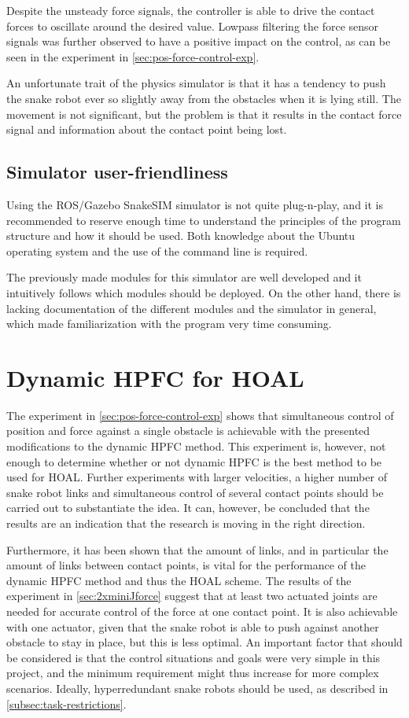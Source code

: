 Despite the unsteady force signals, the controller is able to drive the contact forces to oscillate around the desired value. Lowpass filtering the force sensor signals was further observed to have a positive impact on the control, as can be seen in the experiment in \ref{sec:pos-force-control-exp}.

An unfortunate trait of the physics simulator is that it has a tendency to push the snake robot ever so slightly away from the obstacles when it is lying still. The movement is not significant, but the problem is that it results in the contact force signal and information about the contact point being lost.

\subsection{Simulator user-friendliness}

Using the ROS/Gazebo SnakeSIM simulator is not quite plug-n-play, and it is recommended to reserve enough time to understand the principles of the program structure and how it should be used. Both knowledge about the Ubuntu operating system and the use of the command line is required.

The previously made modules for this simulator are well developed and it intuitively follows which modules should be deployed. On the other hand, there is lacking documentation of the different modules and the simulator in general, which made familiarization with the program very time consuming.

\section{Dynamic HPFC for HOAL}

The experiment in \ref{sec:pos-force-control-exp} shows that simultaneous control of position and force against a single obstacle is achievable with the presented modifications to the dynamic HPFC method. This experiment is, however, not enough to determine whether or not dynamic HPFC is the best method to be used for HOAL. Further experiments with larger velocities, a higher number of snake robot links and simultaneous control of several contact points should be carried out to substantiate the idea. It can, however, be concluded that the results are an indication that the research is moving in the right direction.

Furthermore, it has been shown that the amount of links, and in particular the amount of links between contact points, is vital for the performance of the dynamic HPFC method and thus the HOAL scheme. The results of the experiment in \ref{sec:2xminiJforce} suggest that at least two actuated joints are needed for accurate control of the force at one contact point. It is also achievable with one actuator, given that the snake robot is able to push against another obstacle to stay in place, but this is less optimal. An important factor that should be considered is that the control situations and goals were very simple in this project, and the minimum requirement might thus increase for more complex scenarios. Ideally, hyperredundant snake robots should be used, as described in \ref{subsec:task-restrictions}.

